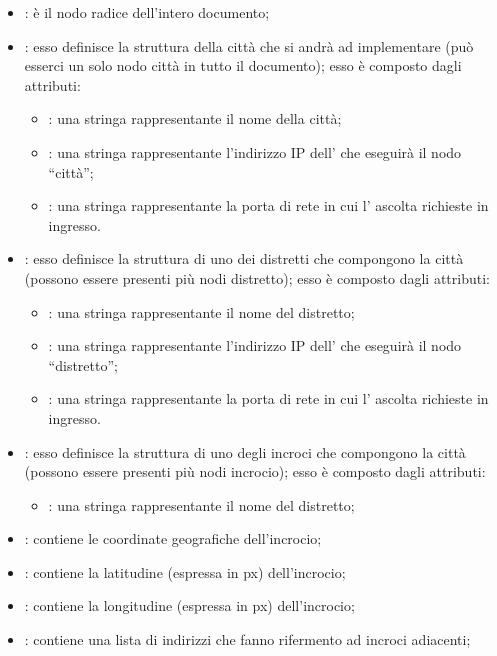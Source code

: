 \begin{itemize}
\item{: è il nodo radice dell'intero documento;}
\item{: esso definisce la struttura della città che si andrà ad implementare (può esserci un solo nodo città in tutto il documento); esso è composto dagli attributi:}
\begin{itemize}
\item{: una stringa rappresentante il nome della città;}
\item{: una stringa rappresentante l'indirizzo IP dell' che eseguirà il nodo ``città'';}
\item{: una stringa rappresentante la porta di rete in cui l' ascolta richieste in ingresso.}
\end{itemize}
\item{: esso definisce la struttura di uno dei distretti che compongono la città (possono essere presenti più nodi distretto); esso è composto dagli attributi:}
\begin{itemize}
\item{: una stringa rappresentante il nome del distretto;}
\item{: una stringa rappresentante l'indirizzo IP dell' che eseguirà il nodo ``distretto'';}
\item{: una stringa rappresentante la porta di rete in cui l' ascolta richieste in ingresso.}
\end{itemize}
\item{: esso definisce la struttura di uno degli incroci che compongono la città (possono essere presenti più nodi incrocio); esso è composto dagli attributi:}
\begin{itemize}
\item{: una stringa rappresentante il nome del distretto;}
\end{itemize}
\item{: contiene le coordinate geografiche dell'incrocio;}
\item{: contiene la latitudine (espressa in px) dell'incrocio;}
\item{: contiene la longitudine (espressa in px) dell'incrocio;}
\item{: contiene una lista di indirizzi che fanno rifermento ad incroci adiacenti;}

\end{itemize}
